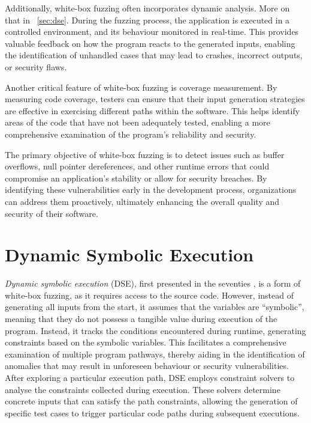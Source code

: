Additionally, white-box fuzzing often incorporates dynamic analysis. More on that in ~\autoref{sec:dse}. During the fuzzing process, the application is executed in a controlled environment, and its behaviour monitored in real-time. This provides valuable feedback on how the program reacts to the generated inputs, enabling the identification of unhandled cases that may lead to crashes, incorrect outputs, or security flaws.

Another critical feature of white-box fuzzing is coverage measurement. By measuring code coverage, testers can ensure that their input generation strategies are effective in exercising different paths within the software. This helps identify areas of the code that have not been adequately tested, enabling a more comprehensive examination of the program's reliability and security.

The primary objective of white-box fuzzing is to detect issues such as buffer overflows, null pointer dereferences, and other runtime errors that could compromise an application’s stability or allow for security breaches. By identifying these vulnerabilities early in the development process, organizations can address them proactively, ultimately enhancing the overall quality and security of their software.\cite{godefroid_random_2007}




\section{Dynamic Symbolic Execution}
\label{sec:dse}
\textit{Dynamic symbolic execution} (DSE), first presented in the seventies \cite{boyer_selectformal_1975}\cite{king_new_1975}\cite{king_symbolic_1976}, is a form of white-box fuzzing, as it requires access to the source code. However, instead of generating all inputs from the start, it assumes that the variables are “symbolic”, meaning that they do not possess a tangible value during execution of the program. Instead, it tracks the conditions encountered during runtime, generating constraints based on the symbolic variables. 
This facilitates a comprehensive examination of multiple program pathways, thereby aiding in the identification of anomalies that may result in unforeseen behaviour or security vulnerabilities.
After exploring a particular execution path, DSE employs constraint solvers to analyse the constraints collected during execution. These solvers determine concrete inputs that can satisfy the path constraints, allowing the generation of specific test cases to trigger particular code paths during subsequent executions.

